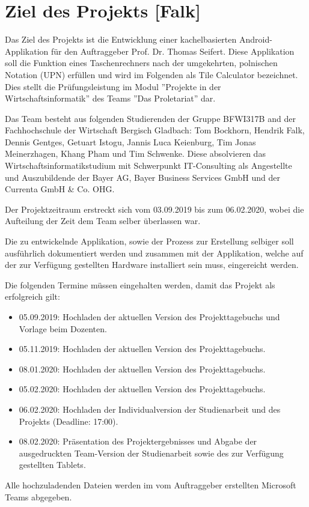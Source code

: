 \section{Ziel des Projekts [Falk]}

Das Ziel des Projekts ist die Entwicklung einer kachelbasierten Android-Applikation für den Auftraggeber Prof. Dr. Thomas Seifert. Diese Applikation soll die Funktion eines Taschenrechners nach der umgekehrten, polnischen Notation (UPN) erfüllen und wird im Folgenden als Tile Calculator bezeichnet. Dies stellt die Prüfungsleistung im Modul ''Projekte in der Wirtschaftsinformatik'' des Teams ''Das Proletariat'' dar. 

Das Team besteht aus folgenden Studierenden der Gruppe BFWI317B and der Fachhochschule der Wirtschaft Bergisch Gladbach: Tom Bockhorn, Hendrik Falk, Dennis Gentges, Getuart Istogu, Jannis Luca Keienburg, Tim Jonas Meinerzhagen, Khang Pham und Tim Schwenke. Diese absolvieren das Wirtschaftsinformatikstudium mit Schwerpunkt IT-Consulting als Angestellte und Auszubildende der Bayer AG, Bayer Business Services GmbH und der Currenta GmbH \& Co. OHG.

Der Projektzeitraum erstreckt sich vom 03.09.2019 bis zum 06.02.2020, wobei die Aufteilung der Zeit dem Team selber überlassen war.

Die zu entwickelnde Applikation, sowie der Prozess zur Erstellung selbiger soll ausführlich dokumentiert werden und zusammen mit der Applikation, welche auf der zur Verfügung gestellten Hardware installiert sein muss, eingereicht werden. 

Die folgenden Termine müssen eingehalten werden, damit das Projekt als erfolgreich gilt: 

\begin{itemize}
	\item 05.09.2019: Hochladen der aktuellen Version des Projekttagebuchs und Vorlage beim Dozenten.
	\item 05.11.2019: Hochladen der aktuellen Version des Projekttagebuchs.
	\item 08.01.2020: Hochladen der aktuellen Version des Projekttagebuchs.
	\item 05.02.2020: Hochladen der aktuellen Version des Projekttagebuchs.
	\item 06.02.2020: Hochladen der Individualversion der Studienarbeit und des Projekts (Deadline: 17:00).
	\item 08.02.2020: Präsentation des Projektergebnisses und Abgabe der ausgedruckten Team-Version der Studienarbeit sowie des zur Verfügung gestellten Tablets.
\end{itemize}

Alle hochzuladenden Dateien werden im vom Auftraggeber erstellten Microsoft Teams abgegeben.